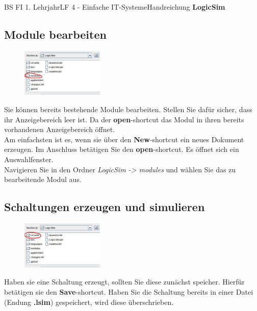 \documentclass[11pt,oneside,openany,headings=optiontotoc,11pt,numbers=noenddot]{article}
\begin{document}
\begin{worksheet}{BS FI 1. Lehrjahr}{LF 4 - Einfache IT-Systeme}{Handreichung \textbf{LogicSim}}
		\subsection{Module bearbeiten}
		\begin{figure}
			\vspace{-10pt}
			\includegraphics[width=0.35\textwidth]{../99_Bilder/folder_mod.jpg}
		\end{figure}
		Sie können bereits bestehende Module bearbeiten. Stellen Sie dafür sicher, dass ihr Anzeigebereich leer ist. Da der \textbf{open}-shortcut das Modul in ihren bereits vorhandenen Anzeigebereich öffnet.\\
		Am einfachsten ist es, wenn sie über den \textbf{New}-shortcut ein neues Dokument erzeugen. Im Anschluss betätigen Sie den \textbf{open}-shortcut. Es öffnet sich ein Auswahlfenster.\\
		Navigieren Sie in den Ordner \textit{LogicSim -> modules} und wählen Sie das zu bearbeitende Modul aus.
		\subsection{Schaltungen erzeugen und simulieren}
		\begin{figure}
			\vspace{-10pt}
			\hspace{-25pt}
			\includegraphics[width=0.35\textwidth]{../99_Bilder/folder_circ.jpg}
		\end{figure}
		Haben sie eine Schaltung erzeugt, sollten Sie diese zunächst speicher. Hierfür betätigen sie den \textbf{Save}-shortcut. Haben Sie die Schaltung bereits in einer Datei (Endung \textbf{.lsim}) gespeichert, wird diese überschrieben.\\
		

\end{worksheet}
\end{document}
